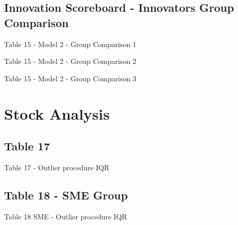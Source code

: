 \documentclass{beamer}					%
\begin{document}
%		

	\subsection{Innovation Scoreboard - Innovators Group Comparison}	

	\begin{frame}{Table 15 - Model 2 - Group Comparison 1}
		
	\end{frame}
	
	\begin{frame}{Table 15 - Model 2 - Group Comparison 2}
		
	\end{frame}

	\begin{frame}{Table 15 - Model 2 - Group Comparison 3}
		
	\end{frame}


%		
	
	\section{Stock Analysis}
	
	\subsection{Table 17}
	
	\begin{frame}{Table 17 - Outlier procedure IQR}
		
	\end{frame}

%		
	
	\subsection{Table 18 - SME Group}
	
	\begin{frame}{Table 18 SME - Outlier procedure IQR}
		
	\end{frame}
\end{document}

